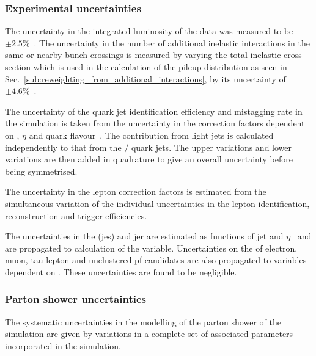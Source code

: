 \subsubsection{Experimental uncertainties} %
\label{sub:experimental_uncertainties}

The uncertainty in the integrated luminosity of the data was measured to be $\pm 2.5\%$~\cite{Sys:Lumi}.
The uncertainty in the number of additional inelastic interactions in the same or nearby bunch crossings is measured by varying the total inelastic cross section which is used in the calculation of the pileup distribution as seen in Sec.~\ref{sub:reweighting_from_additional_interactions}, by its uncertainty of $\pm 4.6\%$~\cite{Sys:PU}.

The uncertainty of the \bquark{} quark jet identification efficiency and mistagging rate in the simulation is taken from the uncertainty in the correction factors dependent on \pt{}, $\eta$ and quark flavour~\cite{Event:BTV}.
The contribution from light jets is calculated independently to that from the \bquark{}/\cquark{} quark jets.
The upper variations and lower variations are then added in quadrature to give an overall uncertainty before being symmetrised.

The uncertainty in the lepton correction factors is estimated from the simultaneous variation of the individual uncertainties in the lepton identification, reconstruction and trigger efficiencies.

The uncertainties in the (\acrshort{jes}) and \acrshort{jer} are estimated as functions of jet \pt{} and $\eta$~\cite{Event:JEC} and are propagated to calculation of the \ptmiss{} variable.
Uncertainties on the \pt{} of electron, muon, tau lepton and unclustered \acrshort{pf} candidates are also propagated to variables dependent on \ptmiss{}.
These uncertainties are found to be negligible.

\subsubsection{Parton shower uncertainties} %
\label{sub:parton_shower_uncertainties}

The systematic uncertainties in the modelling of the parton shower of the \ttbar{} simulation are given by variations in a complete set of associated parameters incorporated in the \powhegpythia{} simulation.


